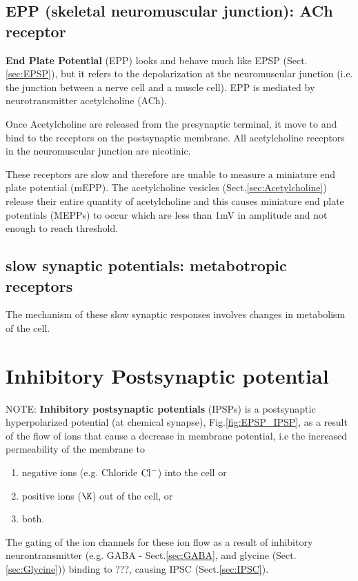 \subsection{EPP (skeletal neuromuscular junction): ACh receptor}
\label{sec:EPP_mechanism}
\label{sec:EPP}

{\bf End Plate Potential} (EPP) looks and behave much like EPSP
(Sect.\ref{sec:EPSP}), but it refers to the depolarization at the neuromuscular
junction (i.e. the junction between a nerve cell and a muscle cell). EPP is
mediated by neurotransmitter acetylcholine (ACh).

Once Acetylcholine are released from the presynaptic terminal, it move to and
bind to the receptors on the postsynaptic membrane. All acetylcholine receptors
in the neuromuscular junction are nicotinic.

These receptors are slow and therefore are unable to measure a miniature end
plate potential (mEPP). The acetylcholine vesicles
(Sect.\ref{sec:Acetylcholine}) release their entire quantity of acetylcholine
and this causes miniature end plate potentials (MEPPs) to occur which are less
than 1mV in amplitude and not enough to reach threshold.


\subsection{slow synaptic potentials: metabotropic receptors}

The mechanism of these slow synaptic responses involves changes in metabolism
of the cell. 



\section{Inhibitory Postsynaptic potential}
\label{sec:IPSP}
\label{sec:IPSP_mechanism}

NOTE: {\bf Inhibitory postsynaptic potentials} (IPSPs) is a postsynaptic
hyperpolarized potential (at chemical synapse), Fig.\ref{fig:EPSP_IPSP}, 
as a result of the flow of ions that cause a decrease in membrane
potential, i.e the increased permeability of the membrane to 

\begin{enumerate}
  
  \item  negative ions (e.g. Chloride ${\text{Cl}^{-}}$) into the cell or
  
  \item positive ions ($\K$) out of the cell, or 
  
  
  \item both.
    
\end{enumerate}

The gating of the ion channels for these ion flow as a result of inhibitory
neurontransmitter (e.g. GABA - Sect.\ref{sec:GABA}, and glycine
(Sect.\ref{sec:Glycine})) binding to ???, causing IPSC (Sect.\ref{sec:IPSC}).
 

% 

